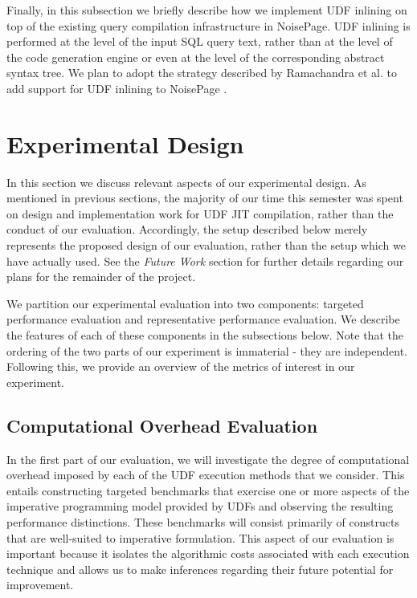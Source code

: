 \documentclass{vldb}
\begin{document}
Finally, in this subsection we briefly describe how we implement UDF inlining on top of the existing query compilation infrastructure in NoisePage. UDF inlining is performed at the level of the input SQL query text, rather than at the level of the code generation engine or even at the level of the corresponding abstract syntax tree. We plan to adopt the strategy described by Ramachandra et al. to add support for UDF inlining to NoisePage \cite{froid}.


\section{Experimental Design}

In this section we discuss relevant aspects of our experimental design. As mentioned in previous sections, the majority of our time this semester was spent on design and implementation work for UDF JIT compilation, rather than the conduct of our evaluation. Accordingly, the setup described below merely represents the proposed design of our evaluation, rather than the setup which we have actually used. See the \textit{Future Work} section for further details regarding our plans for the remainder of the project.

We partition our experimental evaluation into two components: targeted performance evaluation and representative performance evaluation. We describe the features of each of these components in the subsections below. Note that the ordering of the two parts of our experiment is immaterial - they are independent. Following this, we provide an overview of the metrics of interest in our experiment.

\subsection{Computational Overhead Evaluation}

In the first part of our evaluation, we will investigate the degree of computational overhead imposed by each of the UDF execution methods that we consider. This entails constructing targeted benchmarks that exercise one or more aspects of the imperative programming model provided by UDFs and observing the resulting performance distinctions. These benchmarks will consist primarily of constructs that are well-suited to imperative formulation. This aspect of our evaluation is important because it isolates the algorithmic costs associated with each execution technique and allows us to make inferences regarding their future potential for improvement.
\end{document}
